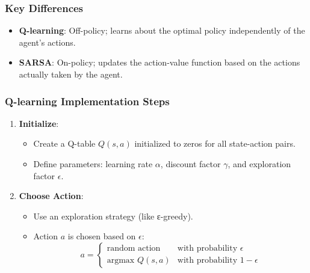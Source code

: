 \documentclass{beamer}
\begin{document}
\begin{frame}
    \frametitle{Key Differences}
    \begin{itemize}
        \item \textbf{Q-learning}: Off-policy; learns about the optimal policy independently of the agent's actions.
        \item \textbf{SARSA}: On-policy; updates the action-value function based on the actions actually taken by the agent.
    \end{itemize}
\end{frame}

\begin{frame}
    \frametitle{Q-learning Implementation Steps}
    \begin{enumerate}
        \item \textbf{Initialize}:
            \begin{itemize}
                \item Create a Q-table \( Q(s, a) \) initialized to zeros for all state-action pairs.
                \item Define parameters: learning rate \( \alpha \), discount factor \( \gamma \), and exploration factor \( \epsilon \).
            \end{itemize}
        \item \textbf{Choose Action}:
            \begin{itemize}
                \item Use an exploration strategy (like ε-greedy).
                \item Action \( a \) is chosen based on \( \epsilon \): 
                \[
                a = \begin{cases}
                \text{random action} & \text{with probability } \epsilon \\
                \text{argmax } Q(s, a) & \text{with probability } 1 - \epsilon
                \end{cases}
                \]
            \end{itemize}
    \end{enumerate}
\end{frame}
\end{document}
